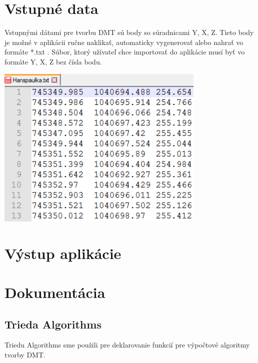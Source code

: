\documentclass[12pt]{article}
\begin{document}
\clearpage 
\section{Vstupné data}
Vstupnými dátami pre tvorbu DMT sú body so súradnicami Y, X, Z. Tieto body je možné v aplikácii ručne naklikať, automaticky vygenerovať alebo nahrať vo formáte *.txt . Súbor, ktorý užívateľ chce importovať do aplikácie musí byť vo formáte Y, X, Z bez čísla bodu.


\begin{center}
   \includegraphics[width=10cm]{./img/vstupny_format.png}
\end{center}


\clearpage 
\section{Výstup aplikácie}



\section{Dokumentácia}
\subsection{Trieda Algorithms}
Triedu Algorithms sme použili pre deklarovanie funkcií pre výpočtové algoritmy tvorby DMT.
\end{document}
